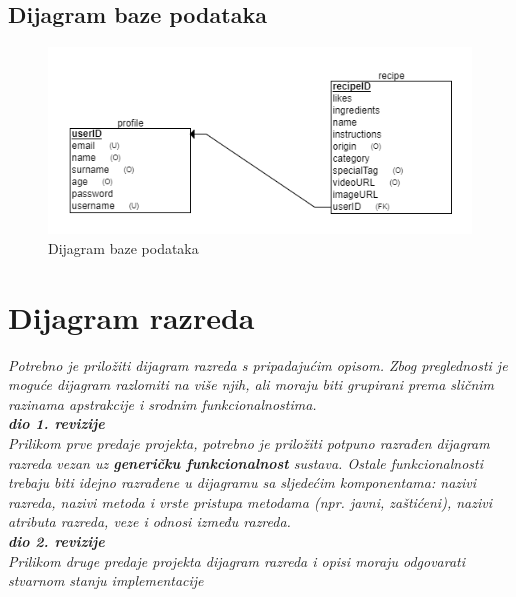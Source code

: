 				
			
			\subsection{Dijagram baze podataka}
			
			\begin{figure}[H]
			    \centering
			    \includegraphics[width=1\linewidth]{slike/ERdiagram.png}
			    \caption{Dijagram baze podataka}
			    \label{fig:enter-label}
			\end{figure}
			
			\eject
			
			
		\section{Dijagram razreda}
		
			\textit{Potrebno je priložiti dijagram razreda s pripadajućim opisom. Zbog preglednosti je moguće dijagram razlomiti na više njih, ali moraju biti grupirani prema sličnim razinama apstrakcije i srodnim funkcionalnostima.}\\
			
			\textbf{\textit{dio 1. revizije}}\\
			
			\textit{Prilikom prve predaje projekta, potrebno je priložiti potpuno razrađen dijagram razreda vezan uz \textbf{generičku funkcionalnost} sustava. Ostale funkcionalnosti trebaju biti idejno razrađene u dijagramu sa sljedećim komponentama: nazivi razreda, nazivi metoda i vrste pristupa metodama (npr. javni, zaštićeni), nazivi atributa razreda, veze i odnosi između razreda.}\\
			
			\textbf{\textit{dio 2. revizije}}\\			
			
			\textit{Prilikom druge predaje projekta dijagram razreda i opisi moraju odgovarati stvarnom stanju implementacije}
			
